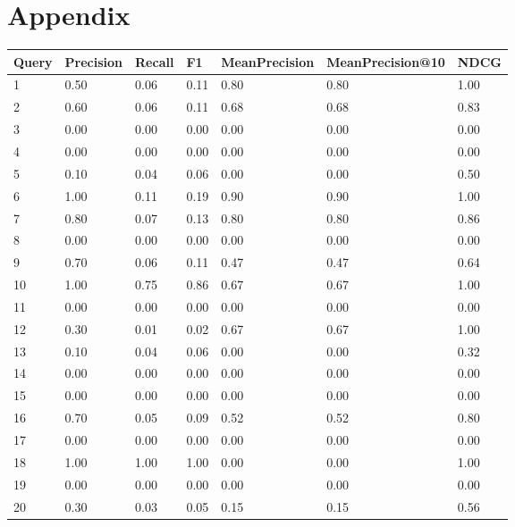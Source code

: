 \documentclass[12pt]{article}
\begin{document}
\clearpage

\appendix
\section*{Appendix}

\begin{longtable}[c]{|l|l|l|l|l|l|l|}
  \hline
  Query & Precision & Recall & F1 & MeanPrecision & MeanPrecision@10 & NDCG \\ \hline
  \endhead
  1 & 0.50 & 0.06 & 0.11 & 0.80 & 0.80 & 1.00 \\ \hline
  2 & 0.60 & 0.06 & 0.11 & 0.68 & 0.68 & 0.83 \\ \hline
  3 & 0.00 & 0.00 & 0.00 & 0.00 & 0.00 & 0.00 \\ \hline
  4 & 0.00 & 0.00 & 0.00 & 0.00 & 0.00 & 0.00 \\ \hline
  5 & 0.10 & 0.04 & 0.06 & 0.00 & 0.00 & 0.50 \\ \hline
  6 & 1.00 & 0.11 & 0.19 & 0.90 & 0.90 & 1.00 \\ \hline
  7 & 0.80 & 0.07 & 0.13 & 0.80 & 0.80 & 0.86 \\ \hline
  8 & 0.00 & 0.00 & 0.00 & 0.00 & 0.00 & 0.00 \\ \hline
  9 & 0.70 & 0.06 & 0.11 & 0.47 & 0.47 & 0.64 \\ \hline
  10 & 1.00 & 0.75 & 0.86 & 0.67 & 0.67 & 1.00 \\ \hline
  11 & 0.00 & 0.00 & 0.00 & 0.00 & 0.00 & 0.00 \\ \hline
  12 & 0.30 & 0.01 & 0.02 & 0.67 & 0.67 & 1.00 \\ \hline
  13 & 0.10 & 0.04 & 0.06 & 0.00 & 0.00 & 0.32 \\ \hline
  14 & 0.00 & 0.00 & 0.00 & 0.00 & 0.00 & 0.00 \\ \hline
  15 & 0.00 & 0.00 & 0.00 & 0.00 & 0.00 & 0.00 \\ \hline
  16 & 0.70 & 0.05 & 0.09 & 0.52 & 0.52 & 0.80 \\ \hline
  17 & 0.00 & 0.00 & 0.00 & 0.00 & 0.00 & 0.00 \\ \hline
  18 & 1.00 & 1.00 & 1.00 & 0.00 & 0.00 & 1.00 \\ \hline
  19 & 0.00 & 0.00 & 0.00 & 0.00 & 0.00 & 0.00 \\ \hline
  20 & 0.30 & 0.03 & 0.05 & 0.15 & 0.15 & 0.56 \\ \hline

\end{longtable}
\end{document}
